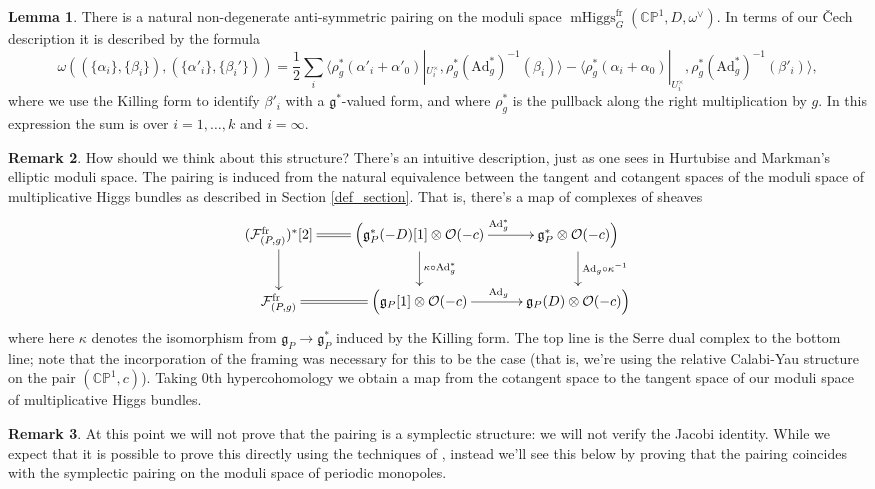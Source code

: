 \documentclass[11pt, oneside, reqno]{amsart}
\theoremstyle{definition} \newtheorem{definition}{Definition}[section]
\newtheorem{lemma}[definition]{Lemma}
\theoremstyle{definition} \newtheorem{remark}[definition]{Remark}
\theoremstyle{definition} \newtheorem{remarks}[definition]{Remarks}
\theoremstyle{definition} \newtheorem{question}[definition]{Question}
\theoremstyle{definition} \newtheorem*{note}{Note}
\theoremstyle{definition} \newtheorem{example}[definition]{Example}
\theoremstyle{definition} \newtheorem{examples}[definition]{Examples}
\renewcommand{\gg}{\mathfrak{g}}
\newcommand{\bb}[1]{\mathbb{#1}}
\newcommand{\mr}[1]{\mathrm{#1}}
\newcommand{\mc}[1]{\mathcal{#1}}
\newcommand{\OO}{\mathcal{O}}
\DeclareMathOperator{\mhiggs}{mHiggs}
\newcommand{\fr}{\mathrm{fr}}
\newcommand{\Ad}{\mr{Ad}}
\begin{document}
\begin{lemma} \label{sym_nondegeneracy_lemma}
There is a natural non-degenerate anti-symmetric pairing on the moduli space $\mhiggs_G^{\fr}(\bb{CP}^1,D,\omega^\vee)$.  In terms of our \v Cech description it is described by the formula 
\[\omega((\{\alpha_i\}, \{\beta_i\}), (\{\alpha'_i\},\{\beta_i'\})) = \frac 12 \sum_i \langle \rho_g^*(\alpha'_i + \alpha'_0)|_{U^\times_i}, \rho_g^*(\Ad_g^*)^{-1}(\beta_i) \rangle - \langle \rho_g^*(\alpha_i + \alpha_0)|_{U^\times_i}, \rho_g^*(\Ad_g^*)^{-1}(\beta'_i) \rangle,\]
where we use the Killing form to identify $\beta'_i$ with a $\gg^*$-valued form, and where $\rho_g^*$ is the pullback along the right multiplication by $g$.  In this expression the sum is over $i=1,\ldots,k$ and $i=\infty$.
\end{lemma}

\begin{remark}
How should we think about this structure?  There's an intuitive description, just as one sees in Hurtubise and Markman's elliptic moduli space.  The pairing is induced from the natural equivalence between the tangent and cotangent spaces of the moduli space of multiplicative Higgs bundles as described in Section \ref{def_section}.  That is, there's a map of complexes of sheaves
\[\xymatrix{
(\mc F^\fr_{(P,g)})^*[2] \ar@{=}[r] \ar[d] &\Big(\gg^*_P(-D)[1] \otimes \OO(-c) \ar[d]^{\kappa \circ \Ad_g^*} \ar[r]^{\Ad_g^*} &\gg^*_P \otimes \OO(-c)\Big)\ar[d]^{\Ad_g \circ \kappa^{-1}} \\
\mc F^\fr_{(P,g)} \ar@{=}[r] &\Big(\gg_P[1] \otimes \OO(-c) \ar[r]^{\Ad_g} &\gg_P(D) \otimes \OO(-c)\Big)
}\]
where here $\kappa$ denotes the isomorphism from $\gg_P \to \gg^*_P$ induced by the Killing form.  The top line is the Serre dual complex to the bottom line; note that the incorporation of the framing was necessary for this to be the case (that is, we're using the relative Calabi-Yau structure on the pair $(\bb{CP}^1, c)$).  Taking 0th hypercohomology we obtain a map from the cotangent space to the tangent space of our moduli space of multiplicative Higgs bundles.
\end{remark}

\begin{remark}
At this point we will not prove that the pairing is a symplectic structure: we will not verify the Jacobi identity.  While we expect that it is possible to prove this directly using the techniques of \cite[Section 5]{HurtubiseMarkman}, instead we'll see this below by proving that the pairing coincides with the symplectic pairing on the moduli space of periodic monopoles.
\end{remark}
\end{document}
